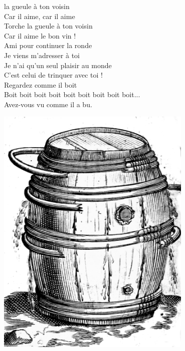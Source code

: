 
 la gueule à ton voisin
\\Car il aime, car il aime
\\Torche la gueule à ton voisin
\\Car il aime le bon vin !
\\Ami pour continuer la ronde
\\Je viens m'adresser à toi
\\Je n'ai qu'un seul plaisir au monde
\\C'est celui de trinquer avec toi !
\\Regardez comme il boit
\\Boit boit boit boit boit boit boit boit boit...
\\Avez-vous vu comme il a bu.
\bigskip
\begin{center}
\centering
    \includegraphics[width=0.7\textwidth]{images/brev15.png}
 \end{center}

\breakpage
